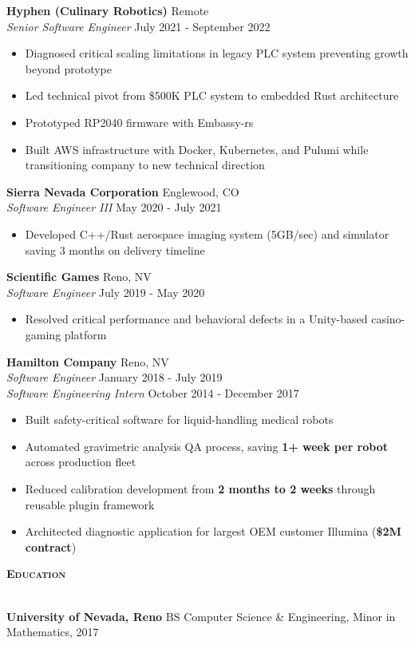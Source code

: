 \documentclass[a4paper]{article}
\newcommand{\lineunder} {
    \vspace*{-8pt} \\
    \hspace*{-18pt} \hrulefill \\
}
\newcommand{\header} [1] {
    {\hspace*{-18pt}\vspace*{6pt} \large \textbf{\textsc{#1}}}
    \vspace*{-6pt} \lineunder
    \vspace*{4pt}
}
\begin{document}
\textbf{Hyphen (Culinary Robotics)} \hfill Remote\\
\textit{Senior Software Engineer} \hfill July 2021 - September 2022\\
\vspace{-1mm}
\begin{itemize} \itemsep 1pt
    \item Diagnosed critical scaling limitations in legacy PLC system preventing growth beyond prototype
    \item Led technical pivot from \$500K PLC system to embedded Rust architecture
    \item Prototyped RP2040 firmware with Embassy-rs
    \item Built AWS infrastructure with Docker, Kubernetes, and Pulumi while transitioning company to new technical direction
\end{itemize}

\textbf{Sierra Nevada Corporation} \hfill Englewood, CO\\
\textit{Software Engineer III} \hfill May 2020 - July 2021\\
\vspace{-1mm}
\begin{itemize} \itemsep 1pt
    \item Developed C++/Rust aerospace imaging system (5GB/sec) and simulator saving 3 months on delivery timeline
\end{itemize}

\textbf{Scientific Games} \hfill Reno, NV\\
\textit{Software Engineer} \hfill July 2019 - May 2020\\
\vspace{-1mm}
\begin{itemize} \itemsep 1pt
    \item Resolved critical performance and behavioral defects in a Unity-based casino-gaming platform
\end{itemize}

\textbf{Hamilton Company} \hfill Reno, NV\\
\textit{Software Engineer} \hfill January 2018 - July 2019\\
\textit{Software Engineering Intern} \hfill October 2014 - December 2017\\
\vspace{-1mm}
\begin{itemize} \itemsep 1pt
    \item Built safety-critical software for liquid-handling medical robots
    \item Automated gravimetric analysis QA process, saving \textbf{1+ week per robot} across production fleet
    \item Reduced calibration development from \textbf{2 months to 2 weeks} through reusable plugin framework
    \item Architected diagnostic application for largest OEM customer Illumina (\textbf{\$2M contract})
\end{itemize}

\header{Education}
\textbf{University of Nevada, Reno} \hfill BS Computer Science \& Engineering, Minor in Mathematics, 2017
\end{document}
